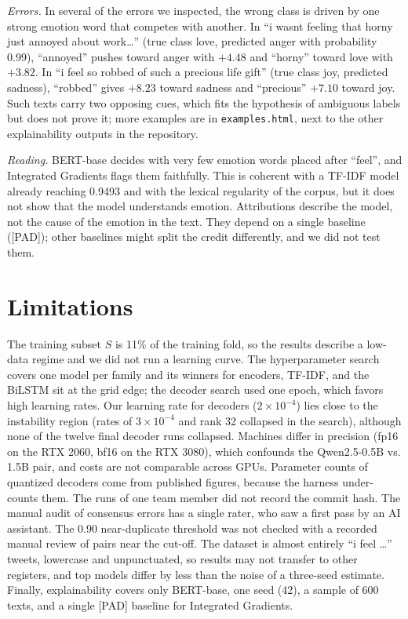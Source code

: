 \textit{Errors.} In several of the errors we inspected, the wrong class is driven by one strong emotion word that competes with another. In ``i wasnt feeling that horny just annoyed about work\ldots'' (true class love, predicted anger with probability 0.99), ``annoyed'' pushes toward anger with $+4.48$ and ``horny'' toward love with $+3.82$. In ``i feel so robbed of such a precious life gift'' (true class joy, predicted sadness), ``robbed'' gives $+8.23$ toward sadness and ``precious'' $+7.10$ toward joy. Such texts carry two opposing cues, which fits the hypothesis of ambiguous labels but does not prove it; more examples are in \texttt{examples.html}, next to the other explainability outputs in the repository.

\textit{Reading.} BERT-base decides with very few emotion words placed after ``feel'', and Integrated Gradients flags them faithfully. This is coherent with a TF-IDF model already reaching 0.9493 and with the lexical regularity of the corpus, but it does not show that the model understands emotion. Attributions describe the model, not the cause of the emotion in the text. They depend on a single baseline ([PAD]); other baselines might split the credit differently, and we did not test them.

\section{Limitations}
\label{sec:limits2}
The training subset $S$ is 11\% of the training fold, so the results describe a low-data regime and we did not run a learning curve. The hyperparameter search covers one model per family and its winners for encoders, TF-IDF, and the BiLSTM sit at the grid edge; the decoder search used one epoch, which favors high learning rates. Our learning rate for decoders ($2\times10^{-4}$) lies close to the instability region (rates of $3\times10^{-4}$ and rank 32 collapsed in the search), although none of the twelve final decoder runs collapsed. Machines differ in precision (fp16 on the RTX 2060, bf16 on the RTX 3080), which confounds the Qwen2.5-0.5B vs. 1.5B pair, and costs are not comparable across GPUs. Parameter counts of quantized decoders come from published figures, because the harness under-counts them. The runs of one team member did not record the commit hash. The manual audit of consensus errors has a single rater, who saw a first pass by an AI assistant. The 0.90 near-duplicate threshold was not checked with a recorded manual review of pairs near the cut-off. The dataset is almost entirely ``i feel \dots'' tweets, lowercase and unpunctuated, so results may not transfer to other registers, and top models differ by less than the noise of a three-seed estimate. Finally, explainability covers only BERT-base, one seed (42), a sample of 600 texts, and a single [PAD] baseline for Integrated Gradients.
